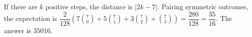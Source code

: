 If there are $k$ positive steps, the distance is $|2k-7|$. Pairing symmetric outcomes, the expectation is $\dfrac{2}{128}(7\binom70+5\binom71+3\binom72+\binom73)=\dfrac{280}{128}=\dfrac{35}{16}$. The answer is $\boxed{35016}$.
